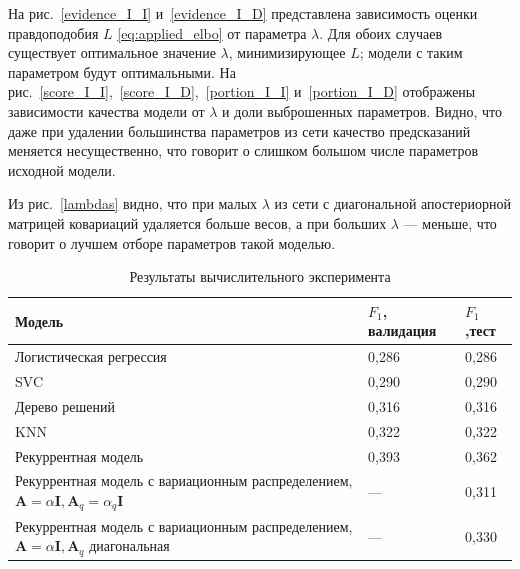 

На рис.~\ref{evidence_I_I} и~\ref{evidence_I_D} представлена зависимость оценки правдоподобия $L$ \eqref{eq:applied_elbo} от параметра $\lambda$.
Для обоих случаев существует оптимальное значение $\lambda$, минимизирующее $L$; модели с таким параметром будут оптимальными. На рис.~\ref{score_I_I},~\ref{score_I_D},~\ref{portion_I_I} и~\ref{portion_I_D} отображены зависимости качества модели от $\lambda$ и доли выброшенных параметров. Видно, что даже при удалении большинства параметров из сети качество предсказаний меняется несущественно, что говорит о слишком большом числе параметров исходной модели.

Из рис.~\ref{lambdas} видно, что при малых $\lambda$ из сети с диагональной апостериорной матрицей ковариаций удаляется больше весов, а при больших $\lambda$ --- меньше, что говорит о лучшем отборе параметров такой моделью.


\begin{table}[!htp]
	\centering
	\caption{Результаты вычислительного эксперимента}
	\label{my-label}
	\begin{tabularx}{\textwidth}{|X|l|l|}
		\hline
		\bf Модель          & $F_1$, \bf валидация & $F_1$,\bf тест\\ \hline
		Логистическая регрессия   & 0,286                 & 0,286            \\ \hline
		SVC                    & 0,290                 & 0,290            \\ \hline
		Дерево решений & 0,316                 & 0,316            \\ \hline
		KNN   & 0,322                 & 0,322            \\ \hline
		Рекуррентная модель                    & 0,393                 & 0,362            \\ \hline
		Рекуррентная модель с вариационным распределением, $\mathbf{A} = \alpha\mathbf{I}, \mathbf{A}_q = \alpha_q\mathbf{I}$  &  ---                     & 0,311            \\ \hline
		Рекуррентная модель с вариационным распределением, $\mathbf{A} = \alpha\mathbf{I}, \mathbf{A}_q$ диагональная   &  ---                     & 0,330             \\ \hline
	\end{tabularx}
\end{table}


